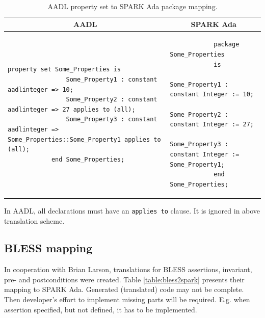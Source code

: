 \singlespacing
\begin{table}[!ht]
	\caption{AADL property set to SPARK Ada package mapping.}
	\label{table:propertyset_mapping}
	\centering
  	\begin{tabular}{ | p{3in} | p{3in} |}

		\hline
		\multicolumn{1}{|c|}{\textbf{AADL}} & \multicolumn{1}{|c|}{\textbf{SPARK Ada}} \\ \hline

		\begin{lstlisting}[language=aadl]
			property set Some_Properties is
				Some_Property1 : constant aadlinteger => 10;
				Some_Property2 : constant aadlinteger => 27 applies to (all);
				Some_Property3 : constant aadlinteger => Some_Properties::Some_Property1 applies to (all);
			end Some_Properties;
		\end{lstlisting} 
		& 
		\begin{lstlisting}
			package Some_Properties
			is
				Some_Property1 : constant Integer := 10;
				Some_Property2 : constant Integer := 27;
				Some_Property3 : constant Integer := Some_Property1;
			end Some_Properties;
		\end{lstlisting} 		

		\\ \hline
	\end{tabular}
\end{table}
\doublespacing

In AADL, all declarations must have an \lstinline{applies to} clause. It is ignored in above translation scheme.


\subsection{BLESS mapping}
\label{codegen:mapping:bless}

In cooperation with Brian Larson, translations for BLESS assertions, invariant, pre- and postconditions were created. Table \ref{table:bless2spark} presents their mapping to SPARK Ada. Generated (translated) code may not be complete. Then developer's effort to implement missing parts will be required. E.g. when assertion specified, but not defined, it has to be implemented.

